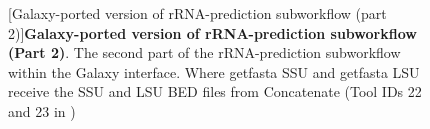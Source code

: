 \begin{figure}[H]
  \centering
  [Galaxy-ported version of rRNA-prediction subworkflow (part 2)]{\textbf{Galaxy-ported version of rRNA-prediction subworkflow (Part 2)}. The second part of the rRNA-prediction subworkflow within the Galaxy interface. Where getfasta SSU and getfasta LSU receive the SSU and LSU BED files from Concatenate (Tool IDs 22 and 23 in )} \label{fig:Galaxy_WF_part2}%
\end{figure}
